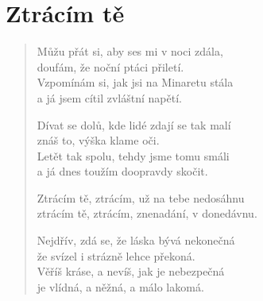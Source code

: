 \section*{Ztrácím tě}

\begin{verse}
Můžu přát si, aby ses mi v noci zdála,\\
doufám, že noční ptáci přiletí. \\
Vzpomínám si, jak jsi na Minaretu stála \\
a já jsem cítil zvláštní napětí.

Dívat se dolů, kde lidé zdají se tak malí\\
znáš to, výška klame oči.\\
Letět tak spolu, tehdy jsme tomu smáli\\
a já dnes toužím doopravdy skočit.

Ztrácím tě, ztrácím, už na tebe nedosáhnu\\
ztrácím tě, ztrácím, znenadání,
v donedávnu.

Nejdřív, zdá se, že láska bývá nekonečná\\
že svízel i strázně lehce překoná.\\
Věříš kráse, a nevíš, jak je nebezpečná\\
je vlídná, a něžná, a málo lakomá.
 

\end{verse}
